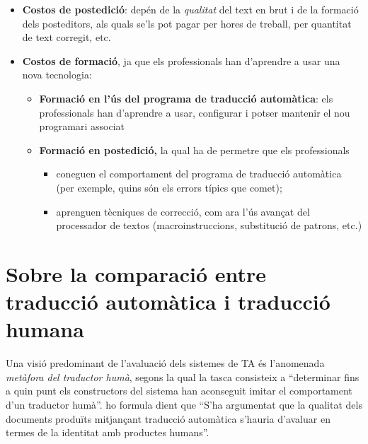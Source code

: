 \begin{enumerate}
\begin{enumerate}
\begin{itemize}
  \item \textbf{Costos de postedició}: depén de la \emph{qualitat} del
    text en brut i de la formació dels posteditors, als quals se'ls
    pot pagar per hores de treball, per quantitat de text corregit,
    etc.

  \item \textbf{Costos de formació}, ja que els professionals han
    d'aprendre a usar una nova tecnologia:
    \begin{itemize}
    \item \textbf{Formació en l'ús del programa de traducció
        automàtica}: els professionals han d'aprendre a usar,
      configurar i potser mantenir el nou programari associat
    \item \textbf{Formació en postedició,} la qual ha de permetre que
      els professionals
      \begin{itemize}
      \item coneguen el comportament del programa de traducció
        automàtica (per exemple, quins són els errors típics que
        comet);
      \item aprenguen tècniques de correcció, com ara l'ús avançat del
        processador de textos (macroinstruccions, substitució de
        patrons, etc.)
      \end{itemize}
    \end{itemize}
  \end{itemize}


\end{enumerate}
\end{enumerate}

\section[Traducció automàtica i traducció humana]{Sobre la comparació entre traducció auto\-mà\-tica i
  traducció humana} 
\label{ss:humaut}
Una visió predominant de l'avaluació dels sistemes de TA és
l'anomenada \emph{metàfora del traductor humà}, segons la qual
\citep{krauwer93j} la tasca consisteix a ``determinar fins a quin punt
els constructors del sistema han aconseguit imitar el comportament
d'un traductor humà''. \citet{sager93b} ho formula dient que ``S'ha
argumentat que la qualitat dels documents produïts mitjançant
traducció automàtica s'hauria d'avaluar en termes de la identitat amb
productes humans''.
  
